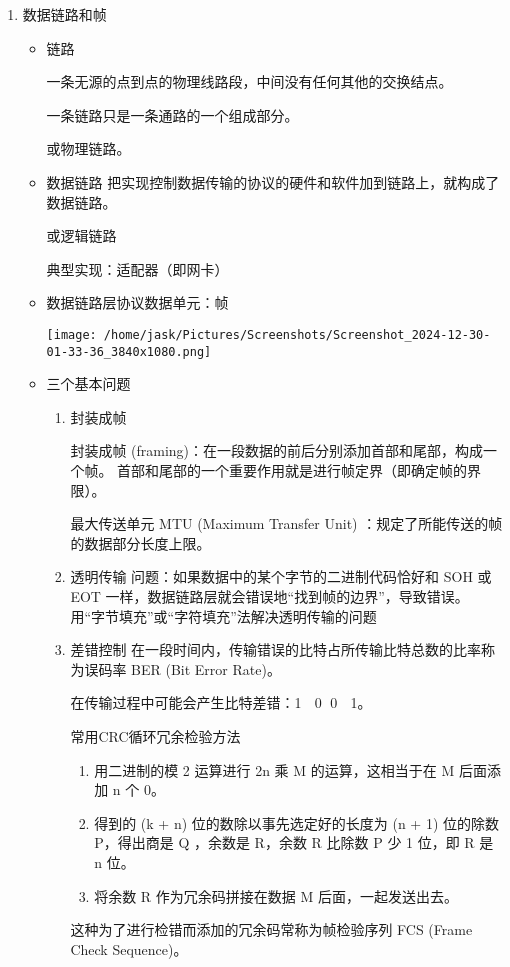 \documentclass[11pt]{article}
\begin{document}
\begin{enumerate}
\item 数据链路和帧
\label{sec:org6ee99c2}

\begin{itemize}
\item 链路

一条无源的点到点的物理线路段，中间没有任何其他的交换结点。

一条链路只是一条通路的一个组成部分。

或物理链路。

\item 数据链路
把实现控制数据传输的协议的硬件和软件加到链路上，就构成了数据链路。

或逻辑链路

典型实现：适配器（即网卡）

\item 数据链路层协议数据单元：帧

\begin{center}
\texttt{[image: /home/jask/Pictures/Screenshots/Screenshot\_2024-12-30-01-33-36\_3840x1080.png]}
\end{center}

\item 三个基本问题
\begin{enumerate}
\item 封装成帧

封装成帧 (framing)：在一段数据的前后分别添加首部和尾部，构成一个帧。
首部和尾部的一个重要作用就是进行帧定界（即确定帧的界限）。

最大传送单元 MTU (Maximum Transfer Unit) ：规定了所能传送的帧的数据部分长度上限。

\item 透明传输
问题：如果数据中的某个字节的二进制代码恰好和 SOH 或 EOT 一样，数据链路层就会错误地“找到帧的边界”，导致错误。
用“字节填充”或“字符填充”法解决透明传输的问题

\item 差错控制
在一段时间内，传输错误的比特占所传输比特总数的比率称为误码率 BER (Bit Error Rate)。

在传输过程中可能会产生比特差错：1    0， 0    1。

常用CRC循环冗余检验方法
\begin{enumerate}
\item 用二进制的模 2 运算进行 2n 乘 M 的运算，这相当于在 M 后面添加 n 个 0。
\item 得到的 (k + n) 位的数除以事先选定好的长度为 (n + 1) 位的除数 P，得出商是 Q ，余数是 R，余数 R 比除数 P 少 1 位，即 R 是 n 位。
\item 将余数 R 作为冗余码拼接在数据 M 后面，一起发送出去。
\end{enumerate}
这种为了进行检错而添加的冗余码常称为帧检验序列 FCS (Frame Check Sequence)。


\end{enumerate}
\end{itemize}
\end{enumerate}
\end{document}
